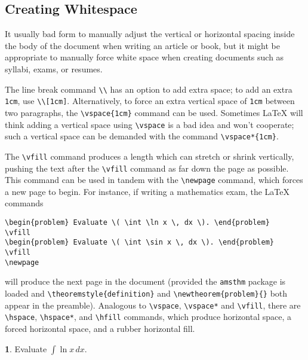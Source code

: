 \documentclass[11pt]{article}
\theoremstyle{definition}
\newtheorem{problem}{}
\begin{document}
\subsection{Creating Whitespace}

It usually bad form to manually adjust the vertical or horizontal spacing inside the body
of the document when writing an article or book, but it might be appropriate to manually
force white space when creating documents such as syllabi, exams, or resumes.

The line break command \verb~\\~ has an option to add extra space; to add an extra
\verb~1cm~, use \verb~\\[1cm]~.  Alternatively, to force an extra vertical space of
\verb~1cm~ between two paragraphs, the \verb~\vspace{1cm}~ command can be used.  Sometimes
\LaTeX{} will think adding a vertical space using \verb~\vspace~ is a bad idea and won't
cooperate; such a vertical space can be demanded with the command \verb~\vspace*{1cm}~.

The \verb~\vfill~ command produces a length which can stretch or shrink vertically,
pushing the text after the \verb~\vfill~ command as far down the page as possible.  This
command can be used in tandem with the \verb~\newpage~ command, which forces a new page to
begin.  For instance, if writing a mathematics exam, the \LaTeX{} commands
\begin{verbatim}
\begin{problem} Evaluate \( \int \ln x \, dx \). \end{problem}
\vfill
\begin{problem} Evaluate \( \int \sin x \, dx \). \end{problem}
\vfill
\newpage
\end{verbatim}
will produce the next page in the document (provided the \verb~amsthm~ package is loaded
and \verb~\theoremstyle{definition}~ and \verb~\newtheorem{problem}{}~ both appear in the
preamble).  Analogous to \verb~\vspace~, \verb~\vspace*~ and \verb~\vfill~, there are
\verb~\hspace~, \verb~\hspace*~, and \verb~\hfill~ commands, which produce horizontal
space, a forced horizontal space, and a rubber horizontal fill.

\newpage

\begin{problem}
  Evaluate \(\displaystyle \int \ln x \, dx \).
\end{problem}
\end{document}
